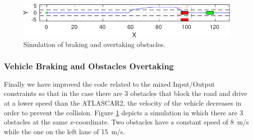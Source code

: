 \documentclass[conference,11pt]{IEEEtran}
\begin{document}
\begin{figure}
\begin{minipage}[t]{\columnwidth}
	\end{minipage}
	\begin{minipage}[t]{\columnwidth}
		\includegraphics[width=1\columnwidth]{./figure/three_obstacles_no_overtaking/braking_6.pdf}
	\end{minipage}	
	\vspace{-23pt}
	\caption{Simulation of braking and overtaking obstacles.}
	\label{fig:braking}
\end{figure}
%
\subsubsection{Vehicle Braking and Obstacles Overtaking}
Finally we have improved the code related to the mixed Input/Output constraints so that in the case there are 3 obstacles that block the road and drive at a lower speed than the ATLASCAR2, the velocity of the vehicle decreases in order to prevent the collision. Figure \ref{fig:braking} depicts a simulation in which there are 3 obstacles at the same $x$-coordinate. Two obstacles have a constant speed of \SI{8}{m/s} while the one on the left lane of \SI{15}{m/s}.
\end{document}
